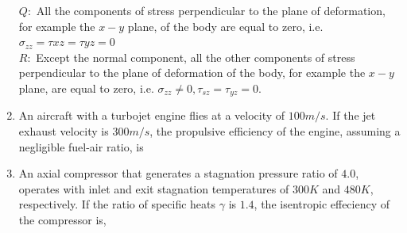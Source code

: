 \documentclass[journal]{IEEEtran}
\begin{document}
\begin{enumerate}
		$Q:$ All the components of stress perpendicular to the plane of deformation, for example the $x-y$ plane, of the body are equal to zero, i.e. $\sigma_{zz}= \tau{xz}=\tau{yz}=0$\\ 
		$R:$ Except the normal component, all the other components of stress perpendicular to the plane of deformation of the body, for example the $x-y$ plane, are equal to zero, i.e. $\sigma_{zz} \ne 0, \tau_{sz}=\tau_{yz}=0$. 
				\begin{enumerate}
		\end{enumerate}
	\item An aircraft with a turbojet engine flies at a velocity of $100 m/s$. If the jet exhaust velocity is $300 m/s$, the propulsive efficiency of the engine, assuming a negligible fuel-air ratio, is
	\begin{enumerate}
	\begin{multicols}{2}
		\item  $0.33$
		 \columnbreak
		\item  $0.50$
    \end{multicols}
\end{enumerate}
\item An axial compressor that generates a stagnation pressure ratio of $4.0$, operates with inlet and exit stagnation temperatures of $300 K$ and $480 K$, respectively. If the ratio of specific heats $\gamma$ is $1.4$, the isentropic effeciency of the compressor is,
	\begin{enumerate}
    \begin{multicols}{2}

\end{multicols}
\end{enumerate}
\end{enumerate}
\end{document}
